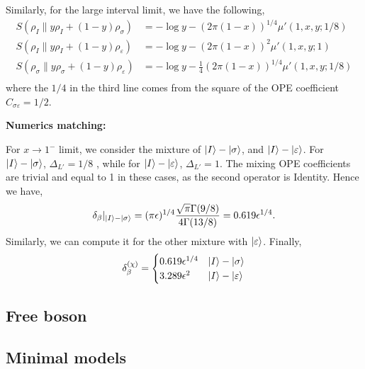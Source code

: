 \documentclass[11pt]{article}
\newcommand{\ep}{\epsilon}
\begin{document}
Similarly, for the large interval limit, we have the following,
\begin{align}
    S(\rho_I \| y \rho_I + (1-y)\rho_\sigma) &= -\log y - (2\pi (1-x))^{1/4} \mu'(1,x,y;1/8)\\
    S(\rho_I \| y \rho_I + (1-y)\rho_\varepsilon) &= -\log y - (2\pi (1-x))^{2} \mu'(1,x,y;1)\\ 
    S(\rho_\sigma \| y \rho_\sigma + (1-y)\rho_\varepsilon) &= -\log y -  \frac{1}{4}(2\pi (1-x))^{1/4} \mu'(1,x,y;1/8)\\
\end{align}
where the $1/4$ in the third line comes from the square of the OPE coefficient $C_{\sigma\varepsilon} = 1/2$. 

\textbf{Numerics matching: } 

 For $x \to 1^-$ limit, we consider the mixture of $\ket I -\ket \sigma$, and  $\ket I -\ket \varepsilon$. For $\ket{I}-\ket{\sigma}$, $\Delta_{L'} = 1/8$ , while for $\ket{I}-\ket{\varepsilon}$, $\Delta_{L'} = 1$. The mixing OPE coefficients are trivial and equal to 1 in these cases, as the second operator is Identity. Hence we have,
\begin{align}
    \delta_\beta|_{\ket I-\ket{\sigma}} = (\pi \ep)^{1/4} \frac{\sqrt{\pi} \Gamma(9/8)}{4\Gamma(13/8)} = 0.619 \ep^{1/4}. 
\end{align}
Similarly, we can compute it for the other mixture with $\ket{\varepsilon}$. Finally,
 \begin{align}
     \delta_\beta^{(\chi)} = \begin{cases}
         0.619  \ep^{1/4} & \ket{I}-\ket{\sigma} \\
         3.289 \ep^2 & \ket{I}-\ket{\varepsilon}
     \end{cases}
 \end{align}

\subsection{Free boson}




\subsection{Minimal models}

\end{document}
